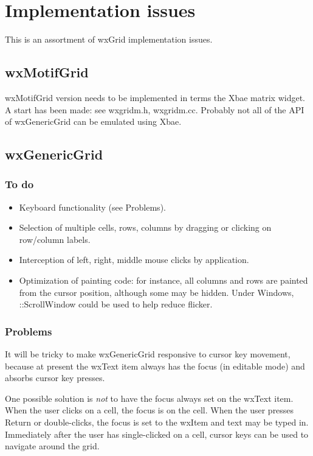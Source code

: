 \chapter{Implementation issues}\label{implementation}
%
\setfooter{\thepage}{}{}{}{}{\thepage}%

This is an assortment of wxGrid implementation issues.

\section{wxMotifGrid}

wxMotifGrid version needs to be implemented in terms the Xbae matrix widget.
A start has been made: see wxgridm.h, wxgridm.cc. Probably not all
of the API of wxGenericGrid can be emulated using Xbae.

\section{wxGenericGrid}

\subsection{To do}

\begin{itemize}\itemsep=0pt
\item Keyboard functionality (see Problems).
\item Selection of multiple cells, rows, columns by dragging or
clicking on row/column labels.
\item Interception of left, right, middle mouse clicks by application.
\item Optimization of painting code: for instance, all columns and rows
are painted from the cursor position, although some may be hidden. Under
Windows, ::ScrollWindow could be used to help reduce flicker.
\end{itemize}

\subsection{Problems}

It will be tricky to make wxGenericGrid responsive to cursor key movement,
because at present the wxText item always has the focus (in editable mode)
and absorbs cursor key presses.

One possible solution is {\it not} to have the focus always set on the wxText item.
When the user clicks on a cell, the focus is on the cell. When the user presses Return
or double-clicks, the focus is set to the wxItem and text may be typed in. Immediately after the
user has single-clicked on a cell, cursor keys can be used to navigate
around the grid.

